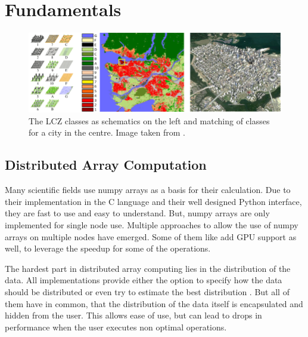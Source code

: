\section{Fundamentals}
\label{sec:fundamentals}

\begin{figure}[t]
  \centering
  \includegraphics[width=0.9\linewidth]{images/schematic-lcz.png}
  \caption{The LCZ classes as schematics on the left and matching of classes for a city in the centre. Image taken from \cite{zhu_so2sat_2019}.}\label{fig:lcz_classes}
\end{figure}


\subsection{Distributed Array Computation}
\label{subsec:distributed_array_computation}
Many scientific fields use \gls{numpy} arrays as a basis for their calculation. Due to their implementation in the C language and their well designed
Python interface, they are fast to use and easy to understand. But, \gls{numpy} arrays are only implemented for single node use.
Multiple approaches to allow the use of \gls{numpy} arrays on multiple nodes have emerged.
Some of them like \cite{bauer_legate_2019} add \gls{GPU} support as well, to leverage the speedup for some of the operations.

The hardest part in distributed array computing lies in the distribution of the data. All implementations provide
either the option to specify how the data should be distributed or even try to estimate the best distribution \cite{huang_spartan_nodate}.
But all of them have in common, that the distribution of the data itself is encapsulated and hidden from the user.
This allows ease of use, but can lead to drops in performance when the user executes non optimal operations.


